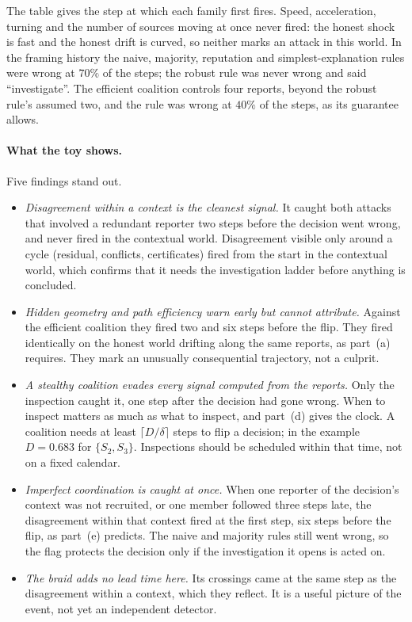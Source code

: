 \documentclass[11pt]{article}
\theoremstyle{definition}\newtheorem{definition}[theorem]{Definition}\newtheorem{remark}[theorem]{Remark}\newtheorem{example}[theorem]{Example}\newtheorem{problem}[theorem]{Open problem}\crefname{problem}{Problem}{Problems}
\begin{document}
The table gives the step at which each family first fires. Speed, acceleration, turning and the number of sources moving at once never fired: the honest shock is fast and the honest drift is curved, so neither marks an attack in this world. In the framing history the naive, majority, reputation and simplest-explanation rules were wrong at $70\%$ of the steps; the robust rule was never wrong and said ``investigate''. The efficient coalition controls four reports, beyond the robust rule's assumed two, and the rule was wrong at $40\%$ of the steps, as its guarantee allows.

\paragraph{What the toy shows.}
Five findings stand out.
\begin{itemize}
\item \emph{Disagreement within a context is the cleanest signal.} It caught both attacks that involved a redundant reporter two steps before the decision went wrong, and never fired in the contextual world. Disagreement visible only around a cycle (residual, conflicts, certificates) fired from the start in the contextual world, which confirms that it needs the investigation ladder before anything is concluded.
\item \emph{Hidden geometry and path efficiency warn early but cannot attribute.} Against the efficient coalition they fired two and six steps before the flip. They fired identically on the honest world drifting along the same reports, as part~(a) requires. They mark an unusually consequential trajectory, not a culprit.
\item \emph{A stealthy coalition evades every signal computed from the reports.} Only the inspection caught it, one step after the decision had gone wrong. When to inspect matters as much as what to inspect, and part~(d) gives the clock. A coalition needs at least $\lceil D/\delta\rceil$ steps to flip a decision; in the example $D=0.683$ for $\{S_2,S_3\}$. Inspections should be scheduled within that time, not on a fixed calendar.
\item \emph{Imperfect coordination is caught at once.} When one reporter of the decision's context was not recruited, or one member followed three steps late, the disagreement within that context fired at the first step, six steps before the flip, as part~(e) predicts. The naive and majority rules still went wrong, so the flag protects the decision only if the investigation it opens is acted on.
\item \emph{The braid adds no lead time here.} Its crossings came at the same step as the disagreement within a context, which they reflect. It is a useful picture of the event, not yet an independent detector.
\end{itemize}
\end{document}
